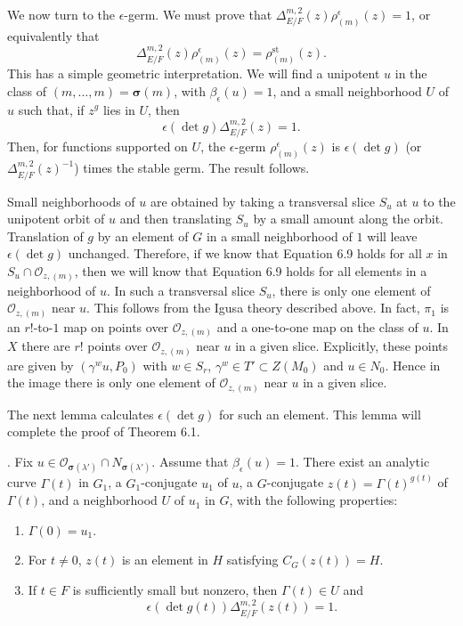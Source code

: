 \documentclass{amsart}
\begin{document}
We now turn to the $\epsilon$-germ.
We must prove that $\Delta^{m,2}_{E/F}(z)\rho^\epsilon_{(m)}(z) = 1$, or equivalently that
$$\Delta^{m,2}_{E/F}(z)\rho^\epsilon_{(m)}(z) = \rho^{\text{st}}_{(m)}(z).$$
This has a simple geometric interpretation.  We will find a unipotent $u$
in the class of $(m,\ldots,m)=\pmb\sigma(m)$, with $\beta_\epsilon(u) = 1$, and a small
neighborhood $U$ of $u$ such that, if $z^g$ lies in $U$, then
\begin{equation}\label{eqn:6.9}\tag{6.9}
\epsilon(\det g)\Delta^{m,2}_{E/F}(z) = 1.
\end{equation}
Then, for functions supported on $U$, the $\epsilon$-germ $\rho^\epsilon_{(m)}(z)$
is $\epsilon(\det g)$ (or $\Delta^{m,2}_{E/F}(z)^{-1}$) times the stable germ.
The result follows.

Small neighborhoods of $u$ are obtained by taking a transversal slice $S_u$
at $u$ to the unipotent orbit of $u$ and then translating $S_u$ by a small
amount along the orbit.
Translation of $g$ by an element of $G$ in a small neighborhood
of $1$ will leave $\epsilon(\det g)$ unchanged.
Therefore, if we know that Equation 6.9 holds for all $x$ in $S_u\cap {\mathcal O}_{z,(m)}$,
then we will know that Equation 6.9 holds for all elements
in a neighborhood of $u$.  In such a transversal slice $S_u$, there is only
one element of ${\mathcal O}_{z,(m)}$ near $u$.  This follows from the
Igusa theory described above.  In fact, $\pi_1$ is an $r!$-to-$1$ map on 
points over ${\mathcal O}_{z,(m)}$
and a one-to-one map on the class of $u$.  In $X$ there are $r!$ points
 over ${\mathcal O}_{z,(m)}$ near $u$
in a given slice.
Explicitly, these points are given by
$(\gamma^wu,P_0)$ with $w\in S_r$, $\gamma^w\in T'\subset Z(M_0)$ and $u\in N_0$.
Hence in the image there is only one element of ${\mathcal O}_{z,(m)}$
near $u$ in a given slice.

The next lemma calculates $\epsilon(\det g)$ for such an element.  This lemma
will complete the proof of Theorem 6.1.


.  Fix $u\in {\mathcal O_{\pmb\sigma(\lambda')}}\cap 
N_{\pmb\sigma(\lambda')}$.  Assume that $\beta_\epsilon(u) = 1$.
There exist an analytic curve $\Gamma(t)$ in $G_1$, a $G_1$-conjugate
$u_1$ of $u$, a $G$-conjugate $z(t)= \Gamma(t)^{g(t)}$ of $\Gamma(t)$, and a
neighborhood $U$ of $u_1$ in $G$,
with the following properties:
\begin{enumerate}[label=(\arabic*)]
\item $\Gamma(0) =u_1$.
\item For $t\ne 0$, $z(t)$ is an element in $H$ satisfying
                  $C_G(z(t)) = H$.
\item If $t\in F$ is sufficiently small but nonzero,
       then $\Gamma(t)\in U$ and 
       $$\epsilon(\det g(t))\Delta^{m,2}_{E/F}(z(t))=1.$$
\end{enumerate}
\finishproclaim
\end{document}
